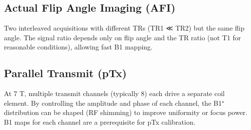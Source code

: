 \subsection{Actual Flip Angle Imaging (AFI)}

				

Two interleaved acquisitions with different TRs (TR1 ≪ TR2) but the same flip angle. The signal ratio depends only on flip angle and the TR ratio (not T1 for reasonable conditions), allowing fast B1 mapping.

				

\subsection{Parallel Transmit (pTx)}

				

At 7 T, multiple transmit channels (typically 8) each drive a separate coil element. By controlling the amplitude and phase of each channel, the B1⁺ distribution can be shaped (RF shimming) to improve uniformity or focus power. B1 maps for each channel are a prerequisite for pTx calibration.



